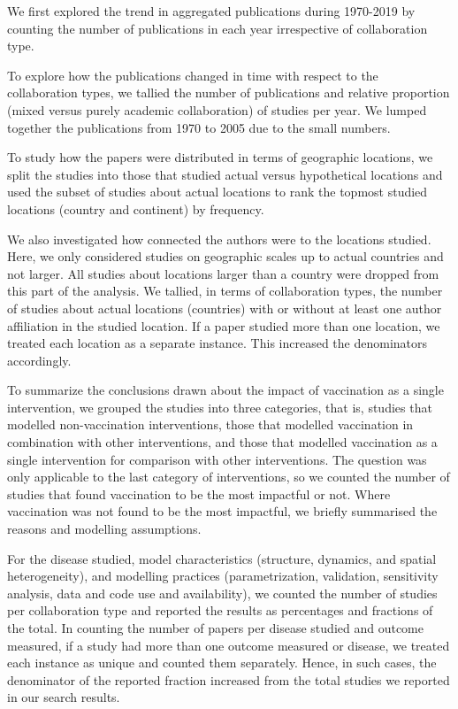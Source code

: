 \documentclass[10pt,letterpaper]{article}
\begin{document}
We first explored the trend in aggregated publications during 1970-2019 by counting the number of publications in each year irrespective of collaboration type. 

To explore how the publications changed in time with respect to the collaboration types, we tallied the number of publications and relative proportion (mixed versus purely academic collaboration) of studies per year. We lumped together the publications from 1970 to 2005 due to the small numbers. 

To study how the papers were distributed in terms of geographic locations, we split the studies into those that studied actual versus hypothetical locations and used the subset of studies about actual locations to rank the topmost studied locations (country and continent) by frequency. 

We also investigated how connected the authors were to the locations studied. Here, we only considered studies on geographic scales up to actual countries and not larger. All studies about locations larger than a country were dropped from this part of the analysis. We tallied, in terms of collaboration types, the number of studies about actual locations (countries) with or without at least one author affiliation in the studied location. If a paper studied more than one location, we treated each location as a separate instance. This increased the denominators accordingly. 

To summarize the conclusions drawn about the impact of vaccination as a single intervention, we grouped the studies into three categories, that is, studies that modelled non-vaccination interventions, those that modelled vaccination in combination with other interventions, and those that modelled vaccination as a single intervention for comparison with other interventions. The question was only applicable to the last category of interventions, so we counted the number of studies that found vaccination to be the most impactful or not. Where vaccination was not found to be the most impactful, we briefly summarised the reasons and modelling assumptions. 

For the disease studied, model characteristics (structure, dynamics, and spatial heterogeneity), and modelling practices (parametrization, validation, sensitivity analysis, data and code use and availability), we counted the number of studies per collaboration type and reported the results as percentages and fractions of the total. In counting the number of papers per disease studied and outcome measured, if a study had more than one outcome measured or disease, we treated each instance as unique and counted them separately. Hence, in such cases, the denominator of the reported fraction increased from the total studies we reported in our search results. 
\end{document}
